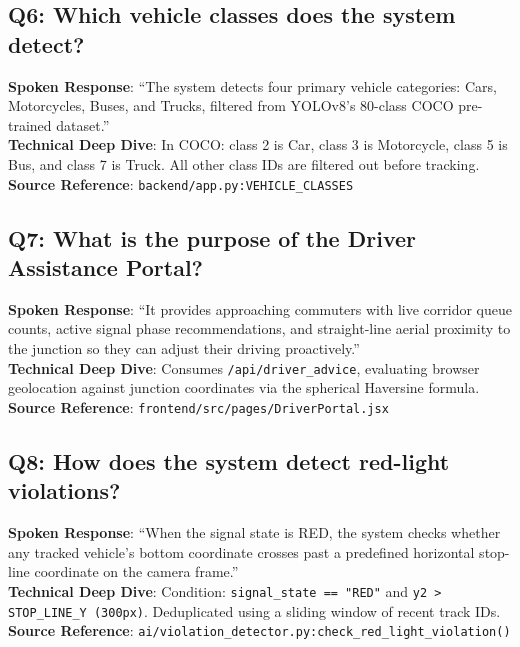 \subsection*{Q6: Which vehicle classes does the system detect?}
\begin{interviewbox}
\textbf{Spoken Response}: ``The system detects four primary vehicle categories: Cars, Motorcycles, Buses, and Trucks, filtered from YOLOv8's 80-class COCO pre-trained dataset.''\\
\textbf{Technical Deep Dive}: In COCO: class 2 is Car, class 3 is Motorcycle, class 5 is Bus, and class 7 is Truck. All other class IDs are filtered out before tracking.\\
\textbf{Source Reference}: \texttt{backend/app.py:VEHICLE\_CLASSES}
\end{interviewbox}

\subsection*{Q7: What is the purpose of the Driver Assistance Portal?}
\begin{interviewbox}
\textbf{Spoken Response}: ``It provides approaching commuters with live corridor queue counts, active signal phase recommendations, and straight-line aerial proximity to the junction so they can adjust their driving proactively.''\\
\textbf{Technical Deep Dive}: Consumes \texttt{/api/driver\_advice}, evaluating browser geolocation against junction coordinates via the spherical Haversine formula.\\
\textbf{Source Reference}: \texttt{frontend/src/pages/DriverPortal.jsx}
\end{interviewbox}

\subsection*{Q8: How does the system detect red-light violations?}
\begin{interviewbox}
\textbf{Spoken Response}: ``When the signal state is RED, the system checks whether any tracked vehicle's bottom coordinate crosses past a predefined horizontal stop-line coordinate on the camera frame.''\\
\textbf{Technical Deep Dive}: Condition: \texttt{signal\_state == "RED"} and \texttt{y2 > STOP\_LINE\_Y (300px)}. Deduplicated using a sliding window of recent track IDs.\\
\textbf{Source Reference}: \texttt{ai/violation\_detector.py:check\_red\_light\_violation()}
\end{interviewbox}

